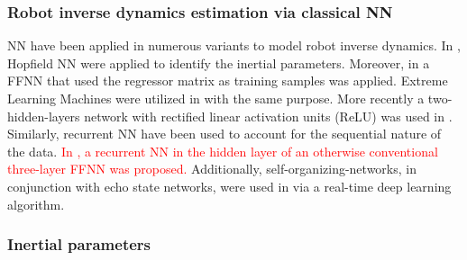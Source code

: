 \subsubsection{Robot inverse dynamics estimation via classical NN}\label{sec:classic_inv_dyn}
NN have been applied in numerous variants to model robot inverse dynamics. In \cite{Atencia2015Hopfieldnetworksoptimization}, Hopfield NN were applied to identify the inertial parameters. Moreover, in \cite{Zhu2014Inertiaparameteridentification} a FFNN that used the regressor matrix as training samples was applied. Extreme Learning Machines were utilized in \cite{Bargsten2016ExperimentalRobotInverse} with the same purpose. More recently a two-hidden-layers network with rectified linear activation units (ReLU) was used in \cite{Christiano2016TransferSimulationReal}. Similarly, recurrent NN have been used to account for the sequential nature of the data. \textcolor{red}{In \cite{Yan1997Robotlearningcontrol}, a recurrent NN in the hidden layer of an otherwise conventional three-layer FFNN was proposed.} Additionally, self-organizing-networks, in conjunction with echo state networks, were used in \cite{Polydoros2015Realtimedeep} via a real-time deep learning algorithm.


\subsubsection{Inertial parameters}

